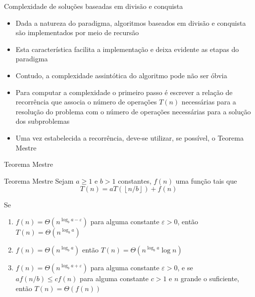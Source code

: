 \begin{frame}[fragile]{Complexidade de soluções baseadas em divisão e conquista}

    \begin{itemize}
        \item Dada a natureza do paradigma, algoritmos baseados em divisão e conquista são
            implementados por meio de recursão

        \item Esta característica facilita a implementação e deixa evidente as etapas do
            paradigma

        \item Contudo, a complexidade assintótica do algoritmo pode não ser óbvia

        \item Para computar a complexidade o primeiro passo é escrever a relação de recorrência
            que associa o número de operações $T(n)$ necessárias para a resolução do problema
            com o número de operações necessárias para a solução dos subproblemas

        \item Uma vez estabelecida a recorrência, deve-se utilizar, se possível, o Teorema Mestre
    \end{itemize}

\end{frame}

\begin{frame}[fragile]{Teorema Mestre}

    \begin{block}{Teorema Mestre}
        Sejam $a\geq 1$ e $b > 1$ constantes, $f(n)$ uma função tais que
        \[
            T(n) = aT\left(\left\lfloor n/b\right\rfloor\right) + f(n)
        \]

        Se
        \begin{enumerate} 
            \item $f(n) = \Theta(n^{\log_b a - \varepsilon})$ para alguma constante $\varepsilon > 0$,
                então $T(n) = \Theta(n^{\log_b a})$

            \item $f(n) = \Theta(n^{\log_b a})$ então $T(n) = \Theta(n^{\log_b a}\log n)$

            \item $f(n) = \Theta(n^{\log_b a + \varepsilon})$ para alguma constante $\varepsilon > 0$,
                e se $af(n/b) \leq cf(n)$ para alguma constante $c > 1$ e $n$ grande o suficiente,
                então $T(n) = \Theta(f(n))$
        \end{enumerate} 
    \end{block}

\end{frame}

